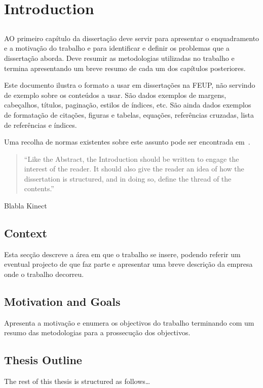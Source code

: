 \chapter{Introduction} \label{chap:intro}

\section*{}

AO primeiro capítulo da dissertação deve servir para apresentar o
enquadramento e a moti\-va\-ção do trabalho e para identificar e
definir os problemas que a dissertação aborda.
Deve resumir as metodologias utilizadas no trabalho e termina
apresentando um breve resumo de cada um dos capítulos
posteriores.

Este documento ilustra o formato a usar em dissertações na \gls{FEUP}, não
servindo de exemplo sobre os conteúdos a usar.
São dados exemplos de margens, cabeçalhos, títulos, paginação, estilos
de índices, etc. 
São ainda dados exemplos de formatação de citações, figuras e tabelas,
equações, referências cruzadas, lista de referências e índices.

Uma recolha de normas existentes sobre este assunto pode ser
encontrada em~\cite{kn:Mat93}. 

\begin{quote}
  ``Like the Abstract, the Introduction should be written to engage the
  interest of the reader. It should also give the reader an idea of
  how the dissertation is structured, and in doing so, define the
  thread of the contents.''~\cite{kn:Tha01} 
\end{quote}

Blabla \gls{Kinect}

\section{Context} \label{sec:context}

Esta secção descreve a área em que o trabalho se insere, podendo
referir um eventual projecto de que faz parte e apresentar uma breve
descrição da empresa onde o trabalho decorreu.


\section{Motivation and Goals} \label{sec:goals}

Apresenta a motivação e enumera os objectivos do trabalho terminando
com um resumo das metodologias para a prossecução dos objectivos.


\section{Thesis Outline} \label{sec:outline}

The rest of this thesis is structured as follows\dots

